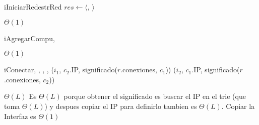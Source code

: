\begin{Algoritmos}

  \nuevoAlgo
  \begin{algoritmo}{iIniciarRed}{}{estrRed}
    $res \gets \langle$\vacio{}, \vacio{}$\rangle$ 
  \end{algoritmo}
  \datosAlgoritmo{} %
  {} %
  {} %
  {$\Theta(1)$} %
  {} %

  \nuevoAlgo
  \begin{algoritmo}{iAgregarCompu}{, }{}
     
     
  \end{algoritmo}
  \datosAlgoritmo{} %
  {} %
  {} %
  {$\Theta(1)$} %
  {} %

  
  
  \nuevoAlgo
  \begin{algoritmo}{iConectar}{, , , , }{}
    ($i_{1}$, $c_{2}$.IP, significado($r$.conexiones, $c_{1}$))
    ($i_{2}$, $c_{1}$.IP, significado($r$.conexiones, $c_{2}$))
  \end{algoritmo}
  \datosAlgoritmo
  {} %
  {} %
  {} %
  {$\Theta(L)$} %
  {Es $\Theta(L)$ porque obtener el significado es buscar el IP en el trie (que toma $\Theta(L)$) y despues copiar el IP para definirlo tambien es $\Theta(L)$. Copiar la Interfaz es $\Theta(1)$ } %
  

\end{Algoritmos}
